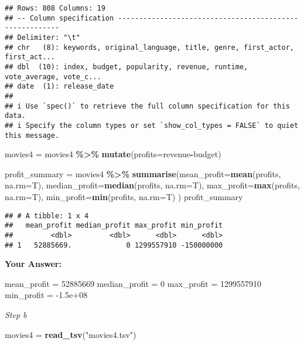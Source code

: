 \documentclass[
]{article}
\newenvironment{Shaded}{\begin{snugshade}}{\end{snugshade}}
\newcommand{\AttributeTok}[1]{\textcolor[rgb]{0.13,0.29,0.53}{#1}}
\newcommand{\FunctionTok}[1]{\textcolor[rgb]{0.13,0.29,0.53}{\textbf{#1}}}
\newcommand{\NormalTok}[1]{#1}
\newcommand{\OtherTok}[1]{\textcolor[rgb]{0.56,0.35,0.01}{#1}}
\newcommand{\SpecialCharTok}[1]{\textcolor[rgb]{0.81,0.36,0.00}{\textbf{#1}}}
\newcommand{\StringTok}[1]{\textcolor[rgb]{0.31,0.60,0.02}{#1}}
\begin{document}
\begin{verbatim}
## Rows: 808 Columns: 19
## -- Column specification --------------------------------------------------------
## Delimiter: "\t"
## chr   (8): keywords, original_language, title, genre, first_actor, first_act...
## dbl  (10): index, budget, popularity, revenue, runtime, vote_average, vote_c...
## date  (1): release_date
## 
## i Use `spec()` to retrieve the full column specification for this data.
## i Specify the column types or set `show_col_types = FALSE` to quiet this message.
\end{verbatim}

\begin{Shaded}
\begin{Highlighting}[]
\NormalTok{movies4 }\OtherTok{=}\NormalTok{ movies4 }\SpecialCharTok{\%\textgreater{}\%}
  \FunctionTok{mutate}\NormalTok{(}\AttributeTok{profits=}\NormalTok{revenue}\SpecialCharTok{{-}}\NormalTok{budget)}

\NormalTok{profit\_summary }\OtherTok{=}\NormalTok{ movies4 }\SpecialCharTok{\%\textgreater{}\%}
  \FunctionTok{summarise}\NormalTok{(}\AttributeTok{mean\_profit=}\FunctionTok{mean}\NormalTok{(profits, }\AttributeTok{na.rm=}\NormalTok{T),}
            \AttributeTok{median\_profit=}\FunctionTok{median}\NormalTok{(profits, }\AttributeTok{na.rm=}\NormalTok{T),}
            \AttributeTok{max\_profit=}\FunctionTok{max}\NormalTok{(profits, }\AttributeTok{na.rm=}\NormalTok{T),}
            \AttributeTok{min\_profit=}\FunctionTok{min}\NormalTok{(profits, }\AttributeTok{na.rm=}\NormalTok{T)}
\NormalTok{            )}
\NormalTok{profit\_summary}
\end{Highlighting}
\end{Shaded}

\begin{verbatim}
## # A tibble: 1 x 4
##   mean_profit median_profit max_profit min_profit
##         <dbl>         <dbl>      <dbl>      <dbl>
## 1   52885669.             0 1299557910 -150000000
\end{verbatim}

\textbf{Your Answer:}

mean\_profit = 52885669 median\_profit = 0 max\_profit = 1299557910
min\_profit = -1.5e+08

\emph{Step b}

\begin{Shaded}
\begin{Highlighting}[]
\NormalTok{movies4 }\OtherTok{=} \FunctionTok{read\_tsv}\NormalTok{(}\StringTok{"movies4.tsv"}\NormalTok{)}
\end{Highlighting}
\end{Shaded}
\end{document}
